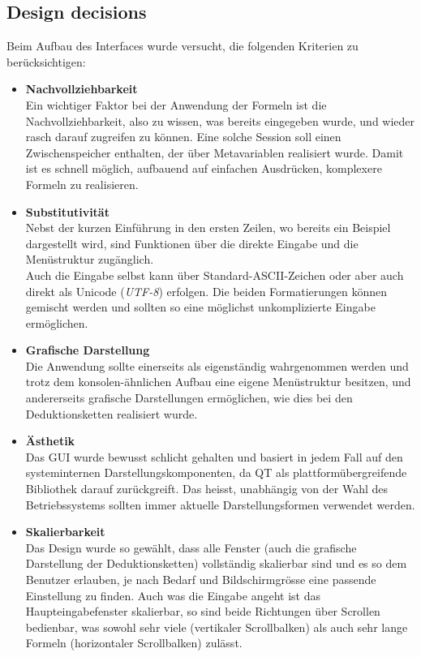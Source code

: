 \documentclass[11pt,a4paper,ngerman]{scrreprt}
\begin{document}
\subsection{Design decisions}
Beim Aufbau des Interfaces wurde versucht, die folgenden Kriterien zu berücksichtigen:
\begin{itemize}
 \item \textbf{Nachvollziehbarkeit} \\
 Ein wichtiger Faktor bei der Anwendung der Formeln ist die Nachvollziehbarkeit, also zu wissen, was bereits eingegeben wurde, und wieder rasch darauf zugreifen zu können. Eine solche Session soll einen Zwischenspeicher enthalten, der über Metavariablen realisiert wurde. Damit ist es schnell möglich, aufbauend auf einfachen Ausdrücken, komplexere Formeln zu realisieren. 
 
 \item \textbf{Substitutivität} \\
 Nebst der kurzen Einführung in den ersten Zeilen, wo bereits ein Beispiel dargestellt wird, sind Funktionen über die direkte Eingabe und die Menüstruktur zugänglich. \\
 Auch die Eingabe selbst kann über Standard-ASCII-Zeichen oder aber auch direkt als Unicode (\textit{UTF-8}) erfolgen. Die beiden Formatierungen können gemischt werden und sollten so eine möglichst unkomplizierte Eingabe ermöglichen.
 
 \item \textbf{Grafische Darstellung} \\
 Die Anwendung sollte einerseits als eigenständig wahrgenommen werden und trotz dem konsolen-ähnlichen Aufbau eine eigene Menüstruktur besitzen, und andererseits grafische Darstellungen ermöglichen, wie dies bei den Deduktionsketten realisiert wurde.
 
 \item \textbf{Ästhetik} \\
 Das GUI wurde bewusst schlicht gehalten und basiert in jedem Fall auf den systeminternen Darstellungskomponenten, da QT als plattformübergreifende Bibliothek darauf zurückgreift.  Das heisst, unabhängig von der Wahl des Betriebssystems sollten immer aktuelle Darstellungsformen verwendet werden.
 
 \item \textbf{Skalierbarkeit} \\
 Das Design wurde so gewählt, dass alle Fenster (auch die grafische Darstellung der Deduktionsketten) vollständig skalierbar sind und es so dem Benutzer erlauben, je nach Bedarf und Bildschirmgrösse eine passende Einstellung zu finden. Auch was die Eingabe angeht ist das Haupteingabefenster skalierbar, so sind beide Richtungen über Scrollen bedienbar, was sowohl sehr viele (vertikaler Scrollbalken) als auch sehr lange Formeln (horizontaler Scrollbalken) zulässt.
\end{itemize}
\end{document}
